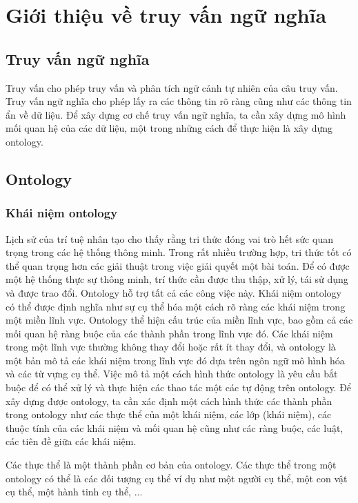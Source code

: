 \section{Giới thiệu về truy vấn ngữ nghĩa}
\subsection{Truy vấn ngữ nghĩa}
Truy vấn cho phép truy vấn và phân tích ngữ cảnh tự nhiên của câu truy vấn. Truy vấn ngữ nghĩa cho phép lấy ra các thông tin rõ ràng cũng như các thông tin ẩn về dữ liệu. Để xây dựng cơ chế truy vấn ngữ nghĩa, ta cần xây dựng mô hình mối quan hệ của các dữ liệu, một trong những cách để thực hiện là xây dựng ontology.

\subsection{Ontology}
\subsubsection{Khái niệm ontology}
Lịch sử của trí tuệ nhân tạo cho thấy rằng tri thức đóng vai trò hết sức quan trọng trong các hệ thống thông minh. Trong rất nhiều trường hợp, tri thức tốt có thể quan trọng hơn các giải thuật trong việc giải quyết một bài toán. Để có được một hệ thống thực sự thông minh, trí thức cần được thu thập, xử lý, tái sử dụng và được trao đổi. Ontology hỗ trợ tất cả các công việc này. Khái niệm ontology có thể được định nghĩa như sự cụ thể hóa một cách rõ ràng các khái niệm trong một miền lĩnh vực. Ontology thể hiện cấu trúc của miền lĩnh vực, bao gồm cả các mối quan hệ ràng buộc của các thành phần trong lĩnh vực đó. Các khái niệm trong một lĩnh vực thường không thay đổi hoặc rất ít thay đổi, và ontology là một bản mô tả các khái niệm trong lĩnh vực đó dựa trên ngôn ngữ mô hình hóa và các từ vựng cụ thể. Việc mô tả một cách hình thức ontology là yêu cầu bắt buộc để có thể xử lý và thực hiện các thao tác một các tự động trên ontology. Để xây dựng được ontology, ta cần xác định một cách hình thức các thành phần trong ontology như các thực thể của một khái niệm, các lớp (khái niệm), các thuộc tính của các khái niệm và mối quan hệ cũng như các ràng buộc, các luật, các tiên đề giữa các khái niệm. 

Các thực thể là một thành phần cơ bản của ontology. Các thực thể trong một ontology có thể là các đối tượng cụ thể ví dụ như một người cụ thể, một con vật cụ thể, một hành tinh cụ thể, ... 

